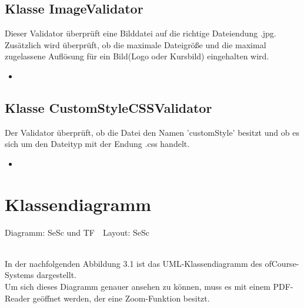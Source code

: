 \documentclass[a4paper]{scrreprt}
\begin{document}
	\subsection{Klasse ImageValidator}
	Dieser Validator überprüft eine Bilddatei auf die richtige Dateiendung .jpg. Zusätzlich wird überprüft, ob
	die maximale Dateigröße und die maximal zugelassene Auflösung für ein Bild(Logo oder Kursbild) eingehalten wird.
	\begin{itemize}
		\item \override
	\end{itemize}
	
	\subsection{Klasse CustomStyleCSSValidator}
	Der Validator überprüft, ob die Datei den Namen 'customStyle' besitzt und ob es sich um den Dateityp mit der Endung .css handelt.
	\begin{itemize}
		\item \override
	\end{itemize}
	
	\section{Klassendiagramm}
	\begin{tiny}
		Diagramm: SeSc und TF\ \ Layout: SeSc\\
	\end{tiny}\\
	In der nachfolgenden Abbildung 3.1 ist das UML-Klassendiagramm des ofCourse-Systems dargestellt.\\
	Um sich dieses Diagramm genauer ansehen zu können, muss es mit einem PDF-Reader
	geöffnet werden, der eine Zoom-Funktion besitzt.

	
	
\end{document}
